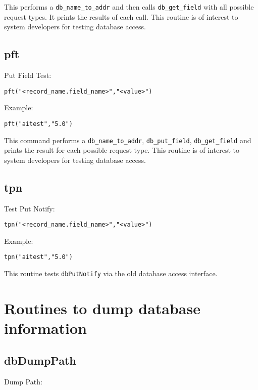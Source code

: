 This performs a \verb|db_name_to_addr| and then calls \verb|db_get_field| with all possible request types. It prints the results 
of each call. This routine is of interest to system developers for testing database access.

\subsection{pft}

Put Field Test:

\begin{verbatim}
pft("<record_name.field_name>","<value>")
\end{verbatim}

Example:

\begin{verbatim}
pft("aitest","5.0")
\end{verbatim}

This command performs a \verb|db_name_to_addr|, \verb|db_put_field|, \verb|db_get_field| and prints the result for each 
possible request type. This routine is of interest to system developers for testing database access.

\subsection{tpn}

Test Put Notify:

\begin{verbatim}
tpn("<record_name.field_name>","<value>")
\end{verbatim}

Example:

\begin{verbatim}
tpn("aitest","5.0")
\end{verbatim}

This routine tests \verb|dbPutNotify| via the old database access interface.

\section{Routines to dump database information}

\subsection{dbDumpPath}

Dump Path:

